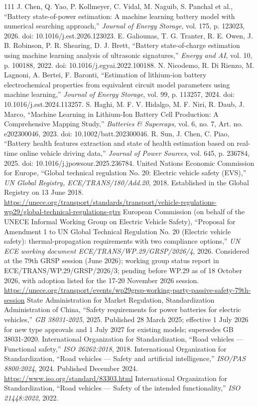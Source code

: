 \documentclass[journal]{IEEEtran}
\begin{document}
\begin{thebibliography}{111}
J. Chen, Q. Yao, P. Kollmeyer, C. Vidal, M. Naguib, S. Panchal et al., ``Battery state-of-power estimation: A machine learning battery model with numerical searching approach,'' \emph{Journal of Energy Storage}, vol. 175, p. 123023, 2026. doi: 10.1016/j.est.2026.123023.
E. Galiounas, T. G. Tranter, R. E. Owen, J. B. Robinson, P. R. Shearing, D. J. Brett, ``Battery state-of-charge estimation using machine learning analysis of ultrasonic signatures,'' \emph{Energy and AI}, vol. 10, p. 100188, 2022. doi: 10.1016/j.egyai.2022.100188.
N. Nicodemo, R. Di Rienzo, M. Lagnoni, A. Bertei, F. Baronti, ``Estimation of lithium-ion battery electrochemical properties from equivalent circuit model parameters using machine learning,'' \emph{Journal of Energy Storage}, vol. 99, p. 113257, 2024. doi: 10.1016/j.est.2024.113257.
S. Haghi, M. F. V. Hidalgo, M. F. Niri, R. Daub, J. Marco, ``Machine Learning in Lithium‐Ion Battery Cell Production: A Comprehensive Mapping Study,'' \emph{Batteries \& Supercaps}, vol. 6, no. 7, Art. no. e202300046, 2023. doi: 10.1002/batt.202300046.
R. Sun, J. Chen, C. Piao, ``Battery health features extraction and state of health estimation based on real-time online vehicle driving data,'' \emph{Journal of Power Sources}, vol. 645, p. 236784, 2025. doi: 10.1016/j.jpowsour.2025.236784.
United Nations Economic Commission for Europe, ``Global technical regulation No. 20: Electric vehicle safety (EVS),'' \emph{UN Global Registry, ECE/TRANS/180/Add.20}, 2018. Established in the Global Registry on 13 June 2018. \url{https://unece.org/transport/standards/transport/vehicle-regulations-wp29/global-technical-regulations-gtrs}
European Commission (on behalf of the UNECE Informal Working Group on Electric Vehicle Safety), ``Proposal for Amendment 1 to UN Global Technical Regulation No. 20 (Electric vehicle safety): thermal-propagation requirements with two compliance options,'' \emph{UN ECE working document ECE/TRANS/WP.29/GRSP/2026/4}, 2026. Considered at the 79th GRSP session (June 2026); working group status report in ECE/TRANS/WP.29/GRSP/2026/3; pending before WP.29 as of 18 October 2026, with adoption listed for the 17-20 November 2026 session. \url{https://unece.org/transport/events/wp29grsp-working-party-passive-safety-79th-session}
State Administration for Market Regulation, Standardization Administration of China, ``Safety requirements for power batteries for electric vehicles,'' \emph{GB 38031-2025}, 2025. Published 28 March 2025; effective 1 July 2026 for new type approvals and 1 July 2027 for existing models; supersedes GB 38031-2020.
International Organization for Standardization, ``Road vehicles --- Functional safety,'' \emph{ISO 26262:2018}, 2018.
International Organization for Standardization, ``Road vehicles --- Safety and artificial intelligence,'' \emph{ISO/PAS 8800:2024}, 2024. Published December 2024. \url{https://www.iso.org/standard/83303.html}
International Organization for Standardization, ``Road vehicles --- Safety of the intended functionality,'' \emph{ISO 21448:2022}, 2022.
\end{thebibliography}
\end{document}
